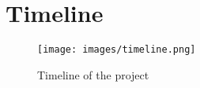 \chapter{Timeline}
\label{ch:timeline}

 \begin{figure}
    \centering
    \texttt{[image: images/timeline.png]}
    \caption{Timeline of the project}
    \label{fig:timeline}
 \end{figure}